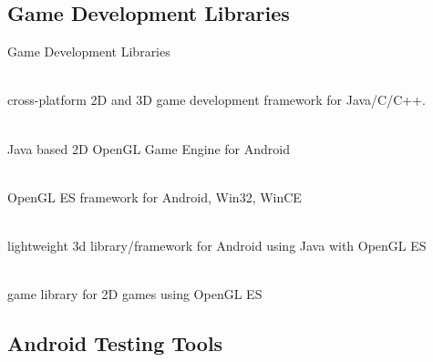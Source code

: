 \documentclass[aspectratio=169]{beamer}
\newcommand{\surl}[1] {{\tiny \url{#1}}}
\begin{document}

\subsection{Game Development Libraries}

    \begin{frame}{Game Development Libraries}
      \begin{description}
        \item<1->[libgdx \surl{http://libgdx.badlogicgames.com/}] \hfill \\ cross-platform 2D and 3D game development framework for Java/C/C++. 
        \item<2->[AndEngine \surl{http://www.andengine.org/}] \hfill \\ Java based 2D OpenGL Game Engine for Android
        \item<3->[forget3D \surl{http://code.google.com/p/forget3d/}] \hfill \\ OpenGL ES framework for Android, Win32, WinCE
        \item<4->[min3d \surl{http://code.google.com/p/min3d/}] \hfill \\ lightweight 3d library/framework for Android using Java with OpenGL ES 
        \item<5->[Angle  \surl{http://code.google.com/p/angle/}] \hfill \\ game library for 2D games using OpenGL ES
      \end{description}
    \end{frame}

  \subsection{Android Testing Tools}
\end{document}
